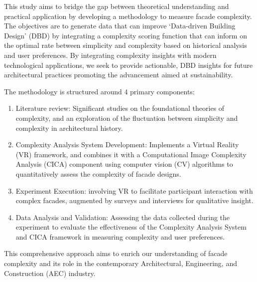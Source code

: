 This study aims to bridge the gap between theoretical understanding and practical application by developing a methodology to measure facade complexity.
The objectives are to generate data that can improve `Data-driven Building Design' (DBD) by integrating a complexity scoring function that can inform on the optimal rate between simplicity and complexity based on historical analysis and user preferences.
By integrating complexity insights with modern technological applications, we seek to provide actionable, DBD insights for future architectural practices promoting the advancement aimed at sustainability.

The methodology is structured around 4 primary components:

\begin{enumerate}
    \item Literature review: Significant studies on the foundational theories of complexity, and an exploration of the fluctuation between simplicity and complexity in architectural history.
    \item Complexity Analysis System Development: Implements a Virtual Reality (VR) framework, and combines it with a Computational Image Complexity Analysis (CICA) component using computer vision (CV) algorithms to quantitatively assess the complexity of facade designs.
    \item Experiment Execution: involving VR to facilitate participant interaction with complex facades, augmented by surveys and interviews for qualitative insight.
    \item Data Analysis and Validation: Assessing the data collected during the experiment to evaluate the effectiveness of the Complexity Analysis System and CICA framework in measuring complexity and user preferences.
\end{enumerate}


This comprehensive approach aims to enrich our understanding of facade complexity and its role in the contemporary Architectural, Engineering, and Construction (AEC) industry.




%
